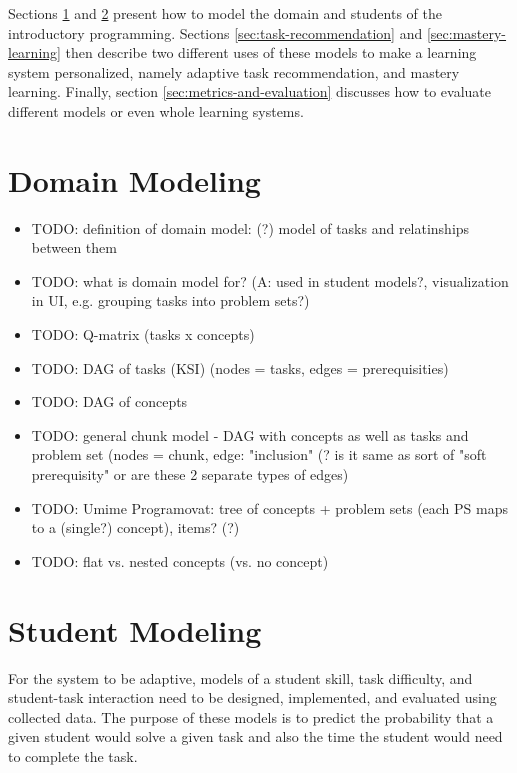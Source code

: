 Sections \ref{sec:domain-modeling} and \ref{sec:student-modeling} present how
to model the domain and students of the introductory programming.
Sections \ref{sec:task-recommendation} and \ref{sec:mastery-learning}
then describe two different uses of these models to make a learning system
personalized, namely adaptive task recommendation, and mastery learning.
Finally, section \ref{sec:metrics-and-evaluation} discusses how to evaluate
different models or even whole learning systems.

\section{Domain Modeling}
\label{sec:domain-modeling}

\begin{itemize}
\item TODO: definition of domain model: (?) model of tasks and relatinships between them
\item TODO: what is domain model for? (A: used in student models?,
  visualization in UI, e.g. grouping tasks into problem sets?)
\item TODO: Q-matrix (tasks x concepts)
\item TODO: DAG of tasks (KSI) (nodes = tasks, edges = prerequisities)
\item TODO: DAG of concepts \cite{its-programming}
\item TODO: general chunk model - DAG with concepts as well as tasks and problem set (nodes = chunk, edge: "inclusion" (? is it same as sort of "soft prerequisity" or are these 2 separate types of edges)
\item TODO: Umime Programovat: tree of concepts + problem sets (each PS maps to a (single?) concept), items? (?)
\item TODO: flat vs. nested concepts (vs. no concept)
\end{itemize}


\section{Student Modeling}
\label{sec:student-modeling}

For the system to be adaptive, models of
  a student skill, task difficulty, and student-task interaction
  need to be designed, implemented, and evaluated using collected data.
The purpose of these models is to predict the probability that a given student
  would solve a given task
  and also the time the student would need to complete the task.


